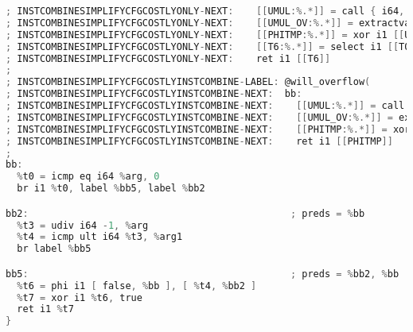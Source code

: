 \documentclass[a4paper]{article}
\theoremstyle{definition}
\begin{document}
\begin{lstlisting}[language=C]
; INSTCOMBINESIMPLIFYCFGCOSTLYONLY-NEXT:    [[UMUL:%.*]] = call { i64, i1 } @llvm.umul.with.overflow.i64(i64 [[ARG]], i64 [[ARG1:%.*]])
; INSTCOMBINESIMPLIFYCFGCOSTLYONLY-NEXT:    [[UMUL_OV:%.*]] = extractvalue { i64, i1 } [[UMUL]], 1
; INSTCOMBINESIMPLIFYCFGCOSTLYONLY-NEXT:    [[PHITMP:%.*]] = xor i1 [[UMUL_OV]], true
; INSTCOMBINESIMPLIFYCFGCOSTLYONLY-NEXT:    [[T6:%.*]] = select i1 [[T0]], i1 true, i1 [[PHITMP]]
; INSTCOMBINESIMPLIFYCFGCOSTLYONLY-NEXT:    ret i1 [[T6]]
;
; INSTCOMBINESIMPLIFYCFGCOSTLYINSTCOMBINE-LABEL: @will_overflow(
; INSTCOMBINESIMPLIFYCFGCOSTLYINSTCOMBINE-NEXT:  bb:
; INSTCOMBINESIMPLIFYCFGCOSTLYINSTCOMBINE-NEXT:    [[UMUL:%.*]] = call { i64, i1 } @llvm.umul.with.overflow.i64(i64 [[ARG:%.*]], i64 [[ARG1:%.*]])
; INSTCOMBINESIMPLIFYCFGCOSTLYINSTCOMBINE-NEXT:    [[UMUL_OV:%.*]] = extractvalue { i64, i1 } [[UMUL]], 1
; INSTCOMBINESIMPLIFYCFGCOSTLYINSTCOMBINE-NEXT:    [[PHITMP:%.*]] = xor i1 [[UMUL_OV]], true
; INSTCOMBINESIMPLIFYCFGCOSTLYINSTCOMBINE-NEXT:    ret i1 [[PHITMP]]
;
bb:
  %t0 = icmp eq i64 %arg, 0
  br i1 %t0, label %bb5, label %bb2

bb2:                                              ; preds = %bb
  %t3 = udiv i64 -1, %arg
  %t4 = icmp ult i64 %t3, %arg1
  br label %bb5

bb5:                                              ; preds = %bb2, %bb
  %t6 = phi i1 [ false, %bb ], [ %t4, %bb2 ]
  %t7 = xor i1 %t6, true
  ret i1 %t7
}
\end{lstlisting}
\end{document}

